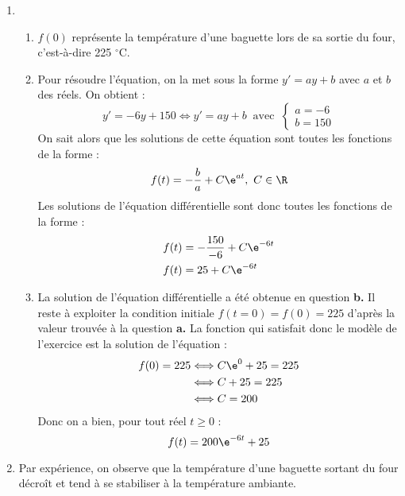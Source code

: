 \begin{enumerate}
\item 
	\begin{enumerate}
		\item%
$f(0)$ représente la température d'une baguette lors de sa sortie du four, c'est-à-dire 225 $^{\circ}$C.		
		\item %
Pour résoudre l'équation, on la met sous la forme $y'=ay+b$ avec $a$ et $b$ des réels. On obtient :
        \begin{equation*}
            y'=-6y+150 \iff y'=ay+b \ \text{ avec } \ \begin{cases}
            a=-6 \\ b=150
            \end{cases}
        \end{equation*}
        On sait alors que les solutions de cette équation sont toutes les fonctions de la forme : 
        \begin{equation*}
            f(t)= - \dfrac{b}{a}+C\e^{at}, \ C \in \R
        \end{equation*}
 Les solutions de l'équation différentielle sont donc toutes les fonctions de la forme : 
        \begin{align*}
            f(t) &= - \dfrac{150}{-6} + C\e^{-6t} \\
            f(t) &= 25 + C\e^{-6t}
        \end{align*}		
		
		\item%
La solution de l'équation différentielle a été obtenue en question \textbf{b.} Il reste à exploiter la condition initiale $f(t=0)=f(0)= 225$ d'après la valeur trouvée à la question \textbf{a.} La fonction qui satisfait donc le modèle de l'exercice est la solution de l'équation : 
        \begin{align*}
            f(0)= 225 &\Longleftrightarrow C\e^{0} + 25 = 225 \\
            &\Longleftrightarrow C + 25 = 225 \\
            &\Longleftrightarrow C= 200
        \end{align*}
        Donc on a bien, pour tout réel $t \geqslant 0$ : 
\begin{equation*}
    f(t)= 200\e^{-6t}+25
\end{equation*}		
		
	\end{enumerate}
\item Par expérience, on observe que la température d'une baguette sortant du four décroît et tend à se stabiliser à la température ambiante.


\end{enumerate}
